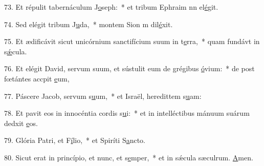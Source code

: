 73. Et répulit tabernáculum J\uline{o}seph:~* et tribum Ephraim nn el\uline{é}git.\par 
74. Sed elégit tribum J\uline{u}da,~* montem Sion m dil\uline{é}xit.\par 
75. Et ædificávit sicut unicórnium sanctifícium suum in t\uline{e}rra,~* quam fundávt in s\uline{ǽ}cula.\par 
76. Et elégit David, servum suum, et sústulit eum de grégibus \uline{ó}vium:~* de post fœtántes accpit \uline{e}um,\par 
77. Páscere Jacob, servum s\uline{u}um,~* et Israël, heredittem s\uline{u}am:\par 
78. Et pavit eos in innocéntia cordis s\uline{u}i:~* et in intelléctibus mánuum suárum dedxit \uline{e}os.\par 
79. Glória Patri, et F\uline{í}lio,~* et Spiríti S\uline{a}ncto.\par 
80. Sicut erat in princípio, et nunc, et s\uline{e}mper,~* et in sǽcula sæculrum. \uline{A}men.\par 
